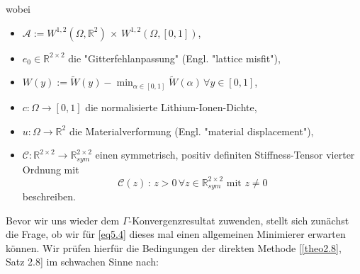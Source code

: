 wobei 
\begin{itemize}
    \item \(\mathcal{A} := W^{1,2}(\Omega,\mathbb{R}^2) \, \times \, W^{1,2}(\Omega,[0,1])\),
    \item \(e_0 \in \mathbb{R}^{2 \times 2}\) die "Gitterfehlanpassung" (Engl. "lattice misfit"),
    \item \(W(y) := \tilde{W}(y) - \min_{\alpha \in [0,1]} \tilde{W}(\alpha) \, \forall y \in [0,1]\),
    \item \(c : \Omega \to [0,1]\) die normalisierte Lithium-Ionen-Dichte,
    \item \(u : \Omega \to \mathbb{R}^2\) die Materialverformung (Engl. "material displacement"),
    \item \(\mathcal{C} : \mathbb{R}^{2 \times 2} \to \mathbb{R}^{2 \times 2}_{sym}\) einen symmetrisch, positiv definiten Stiffness-Tensor vierter Ordnung mit 
    \begin{equation}
        \mathcal{C}(z) \, : \, z > 0 \, \forall z \in \mathbb{R}^{2 \times 2}_{sym} \text{ mit } z \neq 0
    \end{equation}
    beschreiben.
\end{itemize}
Bevor wir uns wieder dem \(\Gamma\)-Konvergenzresultat zuwenden, stellt sich zunächst die Frage, ob wir für \eqref{eq5.4} dieses mal einen allgemeinen Minimierer erwarten können. Wir prüfen hierfür die Bedingungen der direkten Methode [\ref{theo2.8}, Satz 2.8] im schwachen Sinne nach:
